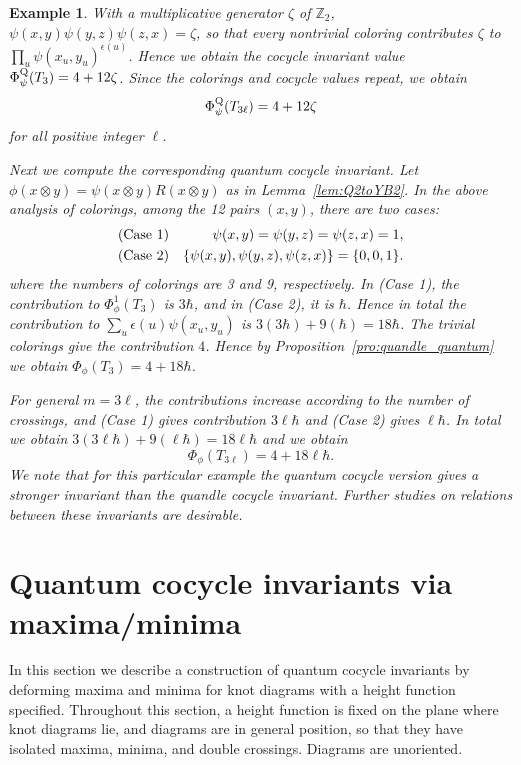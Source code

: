 \documentclass[11pt,fleqn]{amsart} %
\newcommand\Z{{\mathbb Z}}
\newtheorem{example}[theorem]{Example}
\begin{document}
\begin{example}
{			With a multiplicative generator $\zeta $ of $\Z_2$, $\psi(x,y)\psi(y,z) \psi(z,x) =\zeta$,
			so that every nontrivial coloring contributes $\zeta$ to $\prod_{u} \psi(x_u, y_u)^{\epsilon (u) } $.
			Hence  we obtain the cocycle invariant value  $\Phi^{\rm Q}_\psi (T_3)= 4 + 12 \zeta$. Since the colorings and cocycle values repeat, we obtain 
			$$\Phi^{\rm Q}_\psi (T_{3 \ell} ) = 4 + 12 \zeta$$
			for all positive integer $\ell$. 
					
			Next we compute the corresponding quantum cocycle invariant.
			Let $\phi(x \otimes y)=\psi (x \otimes  y) R(x \otimes y)$ as in Lemma~\ref{lem:Q2toYB2}.
			In the above analysis of colorings, among the 12 pairs $(x,y)$, there are two cases: 
			\begin{eqnarray*}
				{\rm (Case \ 1)} & & 
				\psi(x,y)=\psi(y,z)= \psi(z,x) =1 , \\
				{\rm (Case \ 2)} & &  \{ \psi(x,y), \psi(y,z),  \psi(z,x) \} = \{ 0,0,1\} .
			\end{eqnarray*}
			where the numbers of colorings are 3 and 9, respectively.
			In (Case 1), the contribution to $\Phi^1_\phi (T_3)$ is $3 \hbar$, and in (Case 2), it is $\hbar$. 
			Hence in total the contribution
			to $\sum_u \epsilon(u) \psi(x_u, y_u)$  is $3 (3 \hbar) + 9 (\hbar) = 18 \hbar$.
			The trivial colorings give the contribution $4$.
			Hence by Proposition~\ref{pro:quandle_quantum} we obtain 
			$\Phi_\phi (T_3)= 4 + 18 \hbar$.
			
			For general $m=3 \ell$, the contributions increase according to the number of crossings, and 
			(Case 1) gives contribution $3 \ell \hbar$ and (Case 2) gives $\ell \hbar$.
			In total we obtain $3 (3\ell  \hbar) + 9 (\ell \hbar) = 18 \ell \hbar$ and 
			we obtain 
			$$\Phi_\phi (T_{3 \ell})= 4 + 18 \ell  \hbar . $$
					We note that for this particular example the quantum cocycle version gives a stronger invariant
			than the quandle cocycle invariant. Further studies on relations between these invariants are desirable.
			
		} 
	\end{example}

	


\section{Quantum cocycle invariants  via maxima/minima 
 } \label{sec:cupcap}

In this section we describe a construction of quantum cocycle invariants by deforming maxima and minima
for knot diagrams with a height function specified.
 Throughout this section, a height function is fixed on the plane where knot diagrams lie,
and diagrams are in general position, so that they have isolated maxima, minima, and double crossings.
Diagrams are unoriented. 
\end{document}
